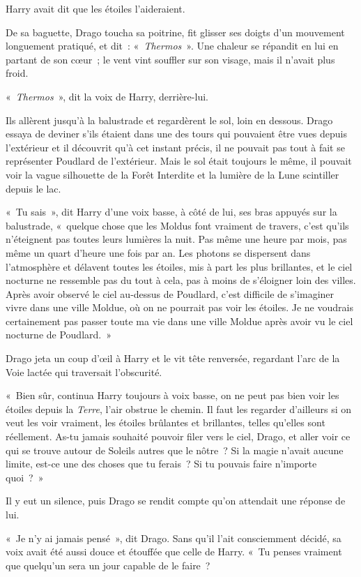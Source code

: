 Harry avait dit que les étoiles l'aideraient.

De sa baguette, Drago toucha sa poitrine, fit glisser ses doigts d'un mouvement longuement pratiqué, et dit~: «~\emph{Thermos}~». Une chaleur se répandit en lui en partant de son cœur~; le vent vint souffler sur son visage, mais il n'avait plus froid.

«~\emph{Thermos}~», dit la voix de Harry, derrière-lui.

Ils allèrent jusqu'à la balustrade et regardèrent le sol, loin en dessous. Drago essaya de deviner s'ils étaient dans une des tours qui pouvaient être vues depuis l'extérieur et il découvrit qu'à cet instant précis, il ne pouvait pas tout à fait se représenter Poudlard de l'extérieur. Mais le sol était toujours le même, il pouvait voir la vague silhouette de la Forêt Interdite et la lumière de la Lune scintiller depuis le lac.

«~Tu sais~», dit Harry d'une voix basse, à côté de lui, ses bras appuyés sur la balustrade, «~quelque chose que les Moldus font vraiment de travers, c'est qu'ils n'éteignent pas toutes leurs lumières la nuit. Pas même une heure par mois, pas même un quart d'heure une fois par an. Les photons se dispersent dans l'atmosphère et délavent toutes les étoiles, mis à part les plus brillantes, et le ciel nocturne ne ressemble pas du tout à cela, pas à moins de s'éloigner loin des villes. Après avoir observé le ciel au-dessus de Poudlard, c'est difficile de s'imaginer vivre dans une ville Moldue, où on ne pourrait pas voir les étoiles. Je ne voudrais certainement pas passer toute ma vie dans une ville Moldue après avoir vu le ciel nocturne de Poudlard.~»

Drago jeta un coup d'œil à Harry et le vit tête renversée, regardant l'arc de la Voie lactée qui traversait l'obscurité.

«~Bien sûr, continua Harry toujours à voix basse, on ne peut pas bien voir les étoiles depuis la \emph{Terre}, l'air obstrue le chemin. Il faut les regarder d'ailleurs si on veut les voir vraiment, les étoiles brûlantes et brillantes, telles qu'elles sont réellement. As-tu jamais souhaité pouvoir filer vers le ciel, Drago, et aller voir ce qui se trouve autour de Soleils autres que le nôtre~? Si la magie n'avait aucune limite, est-ce une des choses que tu ferais~? Si tu pouvais faire n'importe quoi~?~»

Il y eut un silence, puis Drago se rendit compte qu'on attendait une réponse de lui.

«~Je n'y ai jamais pensé~», dit Drago. Sans qu'il l'ait consciemment décidé, sa voix avait été aussi douce et étouffée que celle de Harry. «~Tu penses vraiment que quelqu'un sera un jour capable de le faire~?

